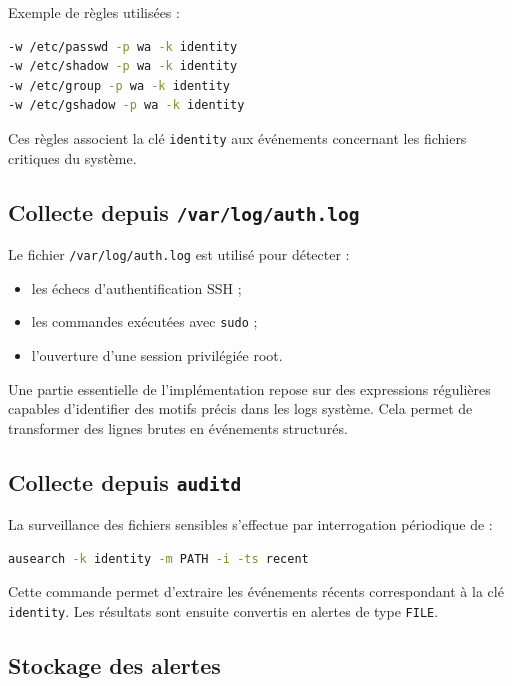 \documentclass[12pt,a4paper]{article}
\begin{document}
Exemple de règles utilisées :

\begin{lstlisting}[language=bash, caption=Règles d’audit pour les fichiers sensibles]
-w /etc/passwd -p wa -k identity
-w /etc/shadow -p wa -k identity
-w /etc/group -p wa -k identity
-w /etc/gshadow -p wa -k identity
\end{lstlisting}

Ces règles associent la clé \texttt{identity} aux événements concernant les fichiers critiques du système.

\subsection{Collecte depuis \texttt{/var/log/auth.log}}

Le fichier \texttt{/var/log/auth.log} est utilisé pour détecter :
\begin{itemize}
    \item les échecs d’authentification SSH ;
    \item les commandes exécutées avec \texttt{sudo} ;
    \item l’ouverture d’une session privilégiée root.
\end{itemize}

Une partie essentielle de l’implémentation repose sur des expressions régulières capables d’identifier des motifs précis dans les logs système. Cela permet de transformer des lignes brutes en événements structurés.

\subsection{Collecte depuis \texttt{auditd}}

La surveillance des fichiers sensibles s’effectue par interrogation périodique de :

\begin{lstlisting}[language=bash, caption=Interrogation des événements d’audit]
ausearch -k identity -m PATH -i -ts recent
\end{lstlisting}

Cette commande permet d’extraire les événements récents correspondant à la clé \texttt{identity}. Les résultats sont ensuite convertis en alertes de type \texttt{FILE}.

\subsection{Stockage des alertes}
\end{document}
